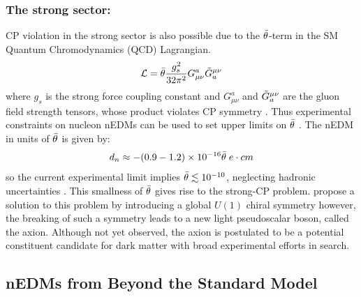 \subsubsection{The strong sector:}
CP violation in the strong sector is also possible due to the $\Bar{\theta}$-term in the SM Quantum Chromodynamics (QCD) Lagrangian. 
\begin{equation}
    \mathcal{L}= \Bar{{\theta}}\frac{g^{2}_{s}}{32\pi^2}G^{a}_{\mu\nu}\Tilde{G}^{\mu\nu}_{a}
    \label{eq:qcd_theta}
\end{equation}
where $g_s$ is the strong force coupling constant and $G^{a}_{\mu\nu}$ and $\Tilde{G}^{\mu\nu}_{a}$ are the gluon field strength tensors, whose product violates CP symmetry \cite{Pospelov1999, Crewther1979}. Thus experimental constraints on nucleon nEDMs can be used to set upper limits on $\Bar{\theta}$ \cite{Pospelov1999, Crewther1979}. The nEDM in units of $\Bar{\theta}$ is given by:
\begin{equation}
    d_{n} \approx -(0.9 - 1.2) \times 10^{-16} \Bar{\theta} \; e \cdot cm
\end{equation}
so the current experimental limit implies $\Bar{\theta} \lesssim 10^{-10}$, neglecting hadronic uncertainties \cite{Seng2015}. This smallness of $\Bar{\theta}$ gives rise to the strong-CP problem. \cite{Peccei1977, Peccei1977a, Hooft1976a} propose a solution to this problem by introducing a global $U(1)$ chiral symmetry however, the breaking of such a symmetry leads to a new light pseudoscalar boson, called the axion. Although not yet observed, the axion is postulated to be a potential constituent candidate for dark matter with broad experimental efforts in search. 


\subsection{nEDMs from Beyond the Standard Model}

